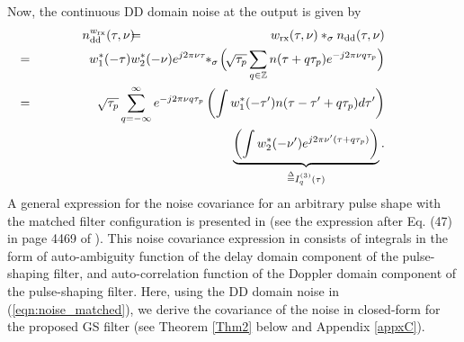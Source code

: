 Now, the continuous DD domain noise at the output is given by
\begin{eqnarray}
n_{\mathrm{dd}}^{w_{\mathrm{rx}}}(\tau,\nu) & \hspace{-2mm} = & \hspace{-2mm} w_{\mathrm{rx}}(\tau,\nu)*_{\sigma}n_{\mathrm{dd}}(\tau,\nu) \nonumber \\ 
& \hspace{-33mm} = & \hspace{-18mm} w_{1}^{*}(-\tau)w_{2}^{*}(-\nu)e^{j2\pi\nu\tau}\hspace{-1mm} *_{\sigma}\hspace{-0.5mm} \Big(\hspace{-0.5mm} \sqrt{\tau_{p}}\sum_{q\in\mathbb{Z}}n(\tau+q\tau_{p})e^{-j2\pi\nu q\tau_{p}}\Big) \nonumber \\ 
& \hspace{-33mm} = & \hspace{-18mm} \sqrt{\tau_{p}}\sum_{q=-\infty}^{\infty}e^{-j2\pi\nu q\tau_{p}}\left(\int w_{1}^{*}(-\tau')n(\tau-\tau'+q\tau_{p})d\tau'\right) \nonumber \\ 
& \hspace{-33mm} & \hspace{-18mm}  \underbrace{\left(\int w_{2}^{*}(-\nu')e^{j2\pi\nu'(\tau+q\tau_{p})}\right)}_{\overset{\Delta}{=}I_{q}^{(3)}(\tau)}.
\label{eqn:noise_matched}
\end{eqnarray}
A general expression for the noise covariance for an arbitrary pulse shape with the matched filter configuration is presented in \cite{zak_otfs5} (see the expression after Eq. (47) in page 4469 of \cite{zak_otfs5}). This noise covariance expression in \cite{zak_otfs5} consists of integrals in the form of auto-ambiguity function of the delay domain component 
of the pulse-shaping filter, and auto-correlation function of the Doppler domain component 
of the pulse-shaping filter. Here, using the DD domain noise in (\ref{eqn:noise_matched}), we derive the covariance of the noise in closed-form for the proposed GS filter (see Theorem \ref{Thm2} below and Appendix \ref{appxC}).

